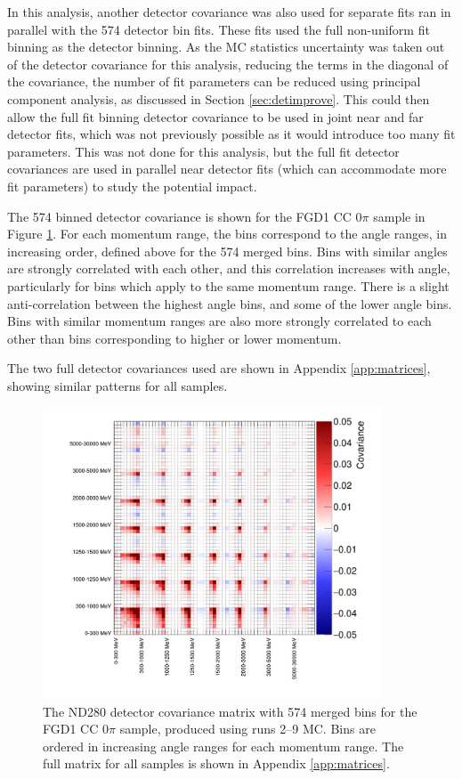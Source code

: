 In this analysis, another detector covariance was also used for separate fits ran in parallel with the 574 detector bin fits. These fits used the full non-uniform fit binning as the detector binning. As the MC statistics uncertainty was taken out of the detector covariance for this analysis, reducing the terms in the diagonal of the covariance, the number of fit parameters can be reduced using principal component analysis, as discussed in Section \ref{sec:detimprove}. This could then allow the full fit binning detector covariance to be used in joint near and far detector fits, which was not previously possible as it would introduce too many fit parameters. This was not done for this analysis, but the full fit detector covariances are used in parallel near detector fits (which can accommodate more fit parameters) to study the potential impact.

The 574 binned detector covariance is shown for the FGD1 CC 0$\pi$ sample in Figure \ref{fig:detcorr5741sample}. For each momentum range, the bins correspond to the angle ranges, in increasing order, defined above for the 574 merged bins. Bins with similar angles are strongly correlated with each other, and this correlation increases with angle, particularly for bins which apply to the same momentum range. There is a slight anti-correlation between the highest angle bins, and some of the lower angle bins. Bins with similar momentum ranges are also more strongly correlated to each other than bins corresponding to higher or lower momentum.

The two full detector covariances used are shown in Appendix \ref{app:matrices}, showing similar patterns for all samples.

\begin{figure}
\centering
\includegraphics*[width=0.9\textwidth,clip]{figs/detcov574_1sample}
\caption{The ND280 detector covariance matrix with 574 merged bins for the FGD1 CC 0$\pi$ sample, produced using runs 2--9 MC. Bins are ordered in increasing angle ranges for each momentum range. The full matrix for all samples is shown in Appendix \ref{app:matrices}.}\label{fig:detcorr5741sample}
\end{figure}

